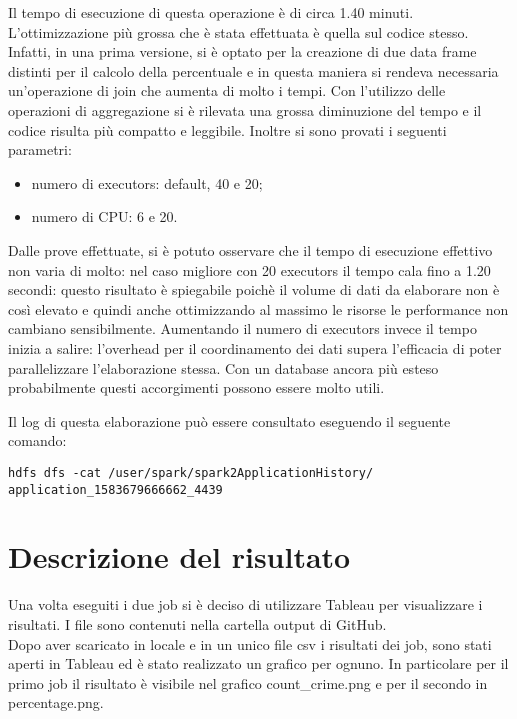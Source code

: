 \documentclass[10pt]{article}
\begin{document}
Il tempo di esecuzione di questa operazione è di circa 1.40 minuti.
L'ottimizzazione più grossa che è stata effettuata è quella sul codice stesso. Infatti, in una prima versione, si è optato per la creazione di due data frame distinti per il calcolo della percentuale e in questa maniera si rendeva necessaria un'operazione di join che aumenta di molto i tempi. Con l'utilizzo delle operazioni di aggregazione si è rilevata una grossa diminuzione del tempo e il codice risulta più compatto e leggibile. Inoltre si sono provati i seguenti parametri:
\begin{itemize}
\item numero di executors: default, 40 e 20;
\item numero di CPU: 6 e 20.
\end{itemize}
Dalle prove effettuate, si è potuto osservare che il tempo di esecuzione effettivo non varia di molto: nel caso migliore con 20 executors il tempo cala fino a 1.20 secondi: questo risultato è spiegabile poichè il volume di dati da elaborare non è così elevato e quindi anche ottimizzando al massimo le risorse le performance non cambiano sensibilmente. Aumentando il numero di executors invece il tempo inizia a salire: l'overhead per il coordinamento dei dati supera l'efficacia di poter parallelizzare l'elaborazione stessa. Con un database ancora più esteso probabilmente questi accorgimenti possono essere molto utili. 

Il log di questa elaborazione può essere consultato eseguendo il seguente comando:
\begin{lstlisting}
hdfs dfs -cat /user/spark/spark2ApplicationHistory/
application_1583679666662_4439
\end{lstlisting}



\section{Descrizione del risultato}
Una volta eseguiti i due job si è deciso di utilizzare Tableau per visualizzare i risultati. I file sono contenuti nella cartella output di GitHub. \\
Dopo aver scaricato in locale e in un unico file csv i risultati dei job, sono stati aperti in Tableau ed è stato realizzato un grafico per ognuno. In particolare per il primo job il risultato è visibile nel grafico count\_crime.png e per il secondo in percentage.png.
\end{document}
